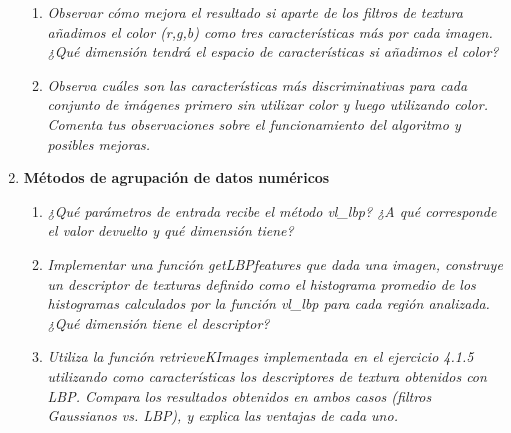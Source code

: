 \documentclass{article}
\begin{document}
\begin{enumerate}
\begin{enumerate}
 \item \textit{Observar cómo mejora el resultado si aparte de los filtros de textura añadimos el color  (r,g,b)  como  tres  características  más  por  cada  imagen.  ¿Qué  dimensión tendrá el espacio de características si añadimos el color?}

 \item \textit{Observa cuáles son las características más discriminativas para cada conjunto de imágenes  primero  sin  utilizar  color  y  luego  utilizando  color.  Comenta  tus observaciones sobre el funcionamiento del algoritmo y posibles mejoras.}

 
 \end{enumerate}

\newpage

 \item \textbf{Métodos de agrupación de datos numéricos}

 \begin{enumerate}
 \item \textit{¿Qué parámetros de entrada recibe el método vl\_lbp? ¿A qué corresponde el valor devuelto y qué dimensión tiene?}

 \item \textit{  Implementar una  función getLBPfeatures que dada una imagen, construye un  descriptor  de  texturas  definido  como  el  histograma  promedio  de  los histogramas  calculados  por  la  función  vl\_lbp para cada  región analizada.  ¿Qué dimensión tiene el descriptor?}

 \item \textit{Utiliza la  función  retrieveKImages implementada en el ejercicio  4.1.5  utilizando como características los descriptores de textura obtenidos con LBP. Compara los resultados  obtenidos en ambos  casos  (filtros Gaussianos  vs.  LBP),  y  explica las ventajas de cada uno.}

 \end{enumerate}

\end{enumerate}
\end{document}
